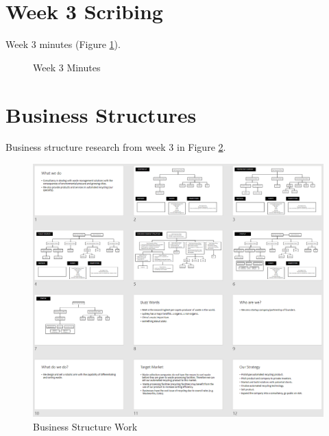 \documentclass[11pt, a4, nocenter, margin=150mm]{article}
\begin{document}
\begin{appendices}
\section{Week 3 Scribing}
\label{app:week3_scribe}
	
	Week 3 minutes (Figure \ref{fig:week3_scribe}).

	\begin{figure}[h!]
		\centering
		\caption{Week 3 Minutes}
		\label{fig:week3_scribe}
	\end{figure}

\pagebreak

\section{Business Structures}
\label{app:business_structures}

	Business structure research from week 3 in Figure \ref{fig:business_structure}.

	\begin{figure}[h!]
		\centering
		\includegraphics[width=\textwidth]{week3/business_structure.png}
		\caption{Business Structure Work}
		\label{fig:business_structure}
	\end{figure}


\end{appendices}
\end{document}
